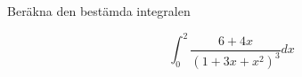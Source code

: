 \documentclass[11pt]{article}
\begin{document}
Beräkna den bestämda integralen

\[
    \int_0^2 \frac{6 + 4x}{(1 + 3x + x^2)^3} dx
\]
\end{document}
